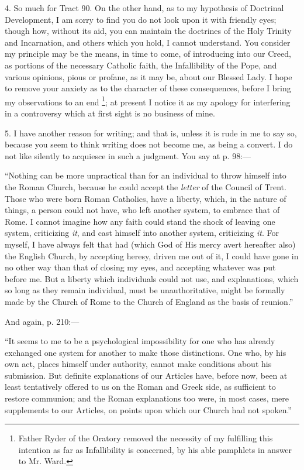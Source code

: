 4. So much for Tract 90. On the other hand, as to my hypothesis of
Doctrinal Development, I am sorry to find you do not look upon it with
friendly eyes; though how, without its aid, you can maintain the
doctrines of the Holy Trinity and Incarnation, and others which you
hold, I cannot understand. You consider my principle may be the means,
in time to come, of introducing into our Creed, as portions of the
necessary Catholic faith, the Infallibility of the Pope, and various
opinions, pious or profane, as it may be, about our Blessed Lady. I
hope to remove your anxiety as to the character of these consequences,
before I bring my observations to an end \footnote{Father Ryder of the Oratory removed the
necessity of my fulfilling this intention as far as Infallibility is
concerned, by his able pamphlets in answer to Mr. Ward.}; at present I notice it as my apology for interfering in a
controversy which at first sight is no business of mine.

5. I have another reason for writing; and that is, unless it is rude
in me to say so, because you seem to think writing does not become me,
as being a convert. I do not like silently to acquiesce in such a
judgment. You say at p. 98:—

``Nothing can be more unpractical than for an individual to throw
himself into the Roman Church, because he could accept the \emph{letter}
of the Council of Trent. Those who were born Roman Catholics, have a
liberty, which, in the nature of things, a person could not have, who
left another system, to embrace that of Rome. I cannot imagine how any
faith could stand the shock of leaving one system, criticizing \emph{it},
and cast himself into another system, criticizing \emph{it}. For myself,
I have always felt that had (which God of His mercy avert hereafter
also) the English Church, by accepting heresy, driven me out of it, I
could have gone in no other way than that of closing my eyes, and
accepting whatever was put before me. But a liberty which individuals
could not use, and explanations, which so long as they remain
individual, must be unauthoritative, might be formally made by the
Church of Rome to the Church of England as the basis of reunion.''

And again, p. 210:—

``It seems to me to be a psychological impossibility for one who
has already exchanged one system for another to make those distinctions.
One who, by his own act, places himself under authority, cannot make
conditions about his submission. But definite explanations of our
Articles have, before now, been at least tentatively offered to us on
the Roman and Greek side, as sufficient to restore communion; and the
Roman explanations too were, in most cases, mere supplements to our
Articles, on points upon which our Church had not spoken.''

